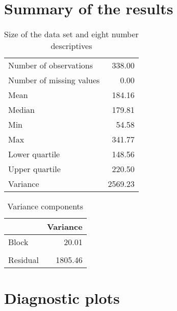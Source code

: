 \documentclass[a4paper,11pt]{article}\usepackage[]{graphicx}\usepackage[]{color}
\begin{document}
\section{Summary of the results}

\begin{table}[ht]
\begin{flushleft}
\caption{Size of the data set and eight number descriptives} 
\label{modelSummary}
\begin{tabular}{lr}
  \hline
  \hline
Number of observations & 338.00 \\ 
  Number of missing values & 0.00 \\ 
  Mean & 184.16 \\ 
  Median & 179.81 \\ 
  Min & 54.58 \\ 
  Max & 341.77 \\ 
  Lower quartile & 148.56 \\ 
  Upper quartile & 220.50 \\ 
  Variance & 2569.23 \\ 
   \hline
\end{tabular}
\end{flushleft}
\end{table}


\begin{table}[ht]
\begin{flushleft}
\caption{Variance components} 
\label{varComps}
\begin{tabular}{lr}
  \hline
 & Variance \\ 
  \hline
Block & 20.01 \\ 
   &  \\ 
  Residual & 1805.46 \\ 
   \hline
\end{tabular}
\end{flushleft}
\end{table}

\clearpage

\section{Diagnostic plots}
\end{document}
